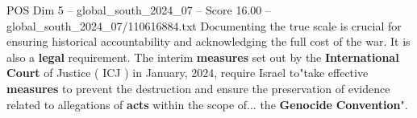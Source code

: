 \begin{textsample}{POS Dim 5 – global\_south\_2024\_07 – Score 16.00 – global\_south\_2024\_07/110616884.txt}
Documenting the true scale is crucial for ensuring historical accountability and acknowledging the full cost of the war.
It is also a \textbf{legal} requirement.
The interim \textbf{measures} set out by the \textbf{International} \textbf{Court} of Justice ( ICJ ) in January, 2024, require Israel to"take effective \textbf{measures} to prevent the destruction and ensure the preservation of evidence related to allegations of \textbf{acts} within the scope of... the \textbf{Genocide} \textbf{Convention}".

\end{textsample}
